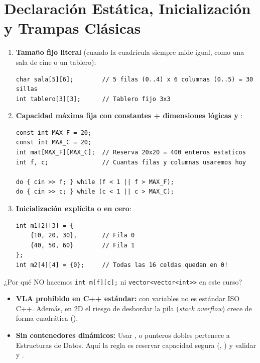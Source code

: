 \documentclass[11pt,letterpaper]{article}
\begin{document}

\section{Declaración Estática, Inicialización y Trampas Clásicas}

\begin{enumerate}
  \item \textbf{Tamaño fijo literal} (cuando la cuadrícula siempre mide igual, como una sala de cine o un tablero):
\begin{lstlisting}[style=cppmonitoria]
char sala[5][6];        // 5 filas (0..4) x 6 columnas (0..5) = 30 sillas
int tablero[3][3];      // Tablero fijo 3x3
\end{lstlisting}
  \item \textbf{Capacidad máxima fija con constantes + dimensiones lógicas  y }:
\begin{lstlisting}[style=cppmonitoria]
const int MAX_F = 20;
const int MAX_C = 20;
int mat[MAX_F][MAX_C];  // Reserva 20x20 = 400 enteros estaticos
int f, c;               // Cuantas filas y columnas usaremos hoy

do { cin >> f; } while (f < 1 || f > MAX_F);
do { cin >> c; } while (c < 1 || c > MAX_C);
\end{lstlisting}
  \item \textbf{Inicialización explícita o en cero}:
\begin{lstlisting}[style=cppmonitoria]
int m1[2][3] = {
    {10, 20, 30},       // Fila 0
    {40, 50, 60}        // Fila 1
};
int m2[4][4] = {0};     // Todas las 16 celdas quedan en 0!
\end{lstlisting}
\end{enumerate}

\begin{peligro}{¿Por qué NO hacemos \texttt{int m[f][c];} ni \texttt{vector<vector<int>>} en este curso?}
\begin{itemize}
  \item \textbf{VLA prohibido en C++ estándar:}  con variables  no es estándar ISO C++. Además, en 2D el riesgo de desbordar la pila (\emph{stack overflow}) crece de forma cuadrática ().
  \item \textbf{Sin contenedores dinámicos:} Usar ,  o punteros dobles pertenece a Estructuras de Datos. Aquí la regla es reservar capacidad segura (, ) y validar  y .
\end{itemize}
\end{peligro}
\end{document}
